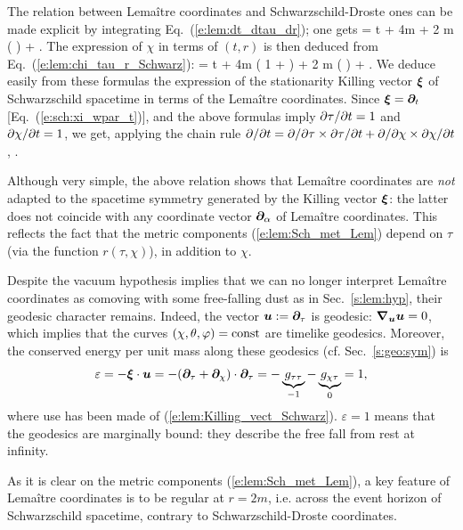 The relation between Lemaître coordinates and
Schwarzschild-Droste ones can be made explicit by integrating
Eq.~(\ref{e:lem:dt_dtau_dr}); one gets
\be
    \tau = t + 4m  + 2 m \ln \left(
         \right) + .
\ee
The expression of $\chi$ in terms of $(t,r)$ is then deduced from
Eq.~(\ref{e:lem:chi_tau_r_Schwarz}):
\be
    \chi = t + 4m  \left( 1 +  \right)
        + 2 m \ln \left(
         \right)  + .
\ee
We deduce easily from these formulas the expression of the stationarity
Killing vector $\bm{\xi}$ of Schwarzschild spacetime in terms of the
Lemaître coordinates. Since $\bm{\xi} = \bm{\partial}_t$ [Eq.~(\ref{e:sch:xi_wpar_t})],
and the above formulas
imply ${\partial \tau}/{\partial t} =1$ and ${\partial \chi}/{\partial t}=1$, we get, applying
the chain rule ${\partial }/{\partial t} = {\partial }/{\partial \tau} \times {\partial \tau}/{\partial t} + {\partial }/{\partial \chi} \times {\partial \chi}/{\partial t}$,
\be \label{e:lem:Killing_vect_Schwarz}
    \encadre{\w{\xi} = \wpar_\tau + \wpar_\chi }.
\ee
\begin{remark}
Although very simple, the above relation shows that Lemaître coordinates are \emph{not}
adapted to the spacetime symmetry generated by the Killing vector $\bm{\xi}$:
the latter does not coincide with any coordinate vector $\bm{\partial}_\alpha$ of
Lemaître coordinates. This reflects
the fact that the metric components (\ref{e:lem:Sch_met_Lem}) depend on $\tau$
(via the function $r(\tau,\chi)$), in addition to $\chi$.
\end{remark}

Despite the vacuum hypothesis implies that we can no longer interpret
Lemaître coordinates as comoving with some free-falling dust as in Sec.~\ref{s:lem:hyp},
their geodesic character remains. Indeed, the vector $\bm{u} := \bm{\partial}_\tau$ is geodesic:
$\bm{\nabla}_{\bm{u}}\bm{u} = 0$, which implies that the curves $(\chi,\theta,\varphi)=\mathrm{const}$
are timelike geodesics. Moreover, the conserved energy per unit mass along these geodesics
(cf. Sec.~\ref{s:geo:sym}) is
\[
     \varepsilon = - \bm{\xi}\cdot\bm{u} = - (\bm{\partial}_\tau + \bm{\partial}_\chi)\cdot \bm{\partial}_\tau
        = - \underbrace{g_{\tau\tau}}_{-1} - \underbrace{g_{\chi\tau}}_{0} = 1 ,
\]
where use has been made of (\ref{e:lem:Killing_vect_Schwarz}).
$\varepsilon=1$ means
that the geodesics are marginally bound: they
describe the free fall from rest at infinity.

As it is clear on the metric components (\ref{e:lem:Sch_met_Lem}),
a key feature of Lemaître coordinates is to be regular at $r=2m$, i.e.
across the event horizon of Schwarzschild spacetime, contrary to
Schwarzschild-Droste coordinates.

